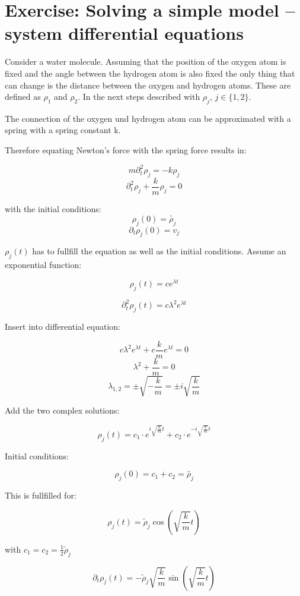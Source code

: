\documentclass[11pt]{article}
\begin{document}
\date{\today}

\section{Exercise: Solving a simple model -- system differential equations}

Consider a water molecule. Assuming that the position of the oxygen atom is fixed and the angle between the hydrogen atom is also fixed the only thing that can change is the distance between the oxygen and hydrogen atoms. These are defined as $\rho_1$ and $\rho_2$. In the next steps described with $\rho_j $, $j \in\{1,2\}$.

The connection of the oxygen und hydrogen atom can be approximated with a spring with a spring constant k. 

Therefore equating Newton's force with the spring force results in:

\[ m \partial^2_t \rho_j = -k\rho_j \]
\[ \partial^2_t \rho_j + \frac{k}{m}\rho_j = 0  \]

with the initial conditions:
\[ \rho_j(0) = \tilde{\rho_j} \]
\[ \partial_t\rho_j(0) = v_j \]

$ \rho_j(t) $ has to fullfill the equation as well as the initial conditions. Assume an exponential function:

\[ \rho_j(t) = c e^{\lambda t} \]

\[ \partial^2_t\rho_j(t) = c \lambda^2 e^{\lambda t} \]

Insert into differential equation:

\[  c \lambda^2 e^{\lambda t} + c \frac{k}{m} e^{\lambda t} = 0 \]
\[ \lambda^2 + \frac{k}{m} = 0 \]
\[ \lambda_{1,2} = \pm\sqrt{-\frac{k}{m}} = \pm i \sqrt{\frac{k}{m}} \]

Add the two complex solutions:

\[ \rho_j(t) = c_1 \cdot e^{i\sqrt{\frac{k}{m}}t} + c_2 \cdot e^{-i\sqrt{\frac{k}{m}}t} \]

Initial conditions:

\[ \rho_j(0) = c_1 + c_2 = \tilde{\rho_j} \]

This is fullfilled for:

\[ \rho_j(t) =\tilde{\rho}_j \cos{\left(\sqrt{\frac{k}{m}}t\right)}\]

with $c_1 = c_2 = \frac{1}{2}\tilde{\rho}_j$

\[ \partial_t \rho_j(t) = - \tilde{\rho}_j \sqrt{\frac{k}{m}} \sin{\left(\sqrt{\frac{k}{m}}t\right)}  \]
\end{document}
